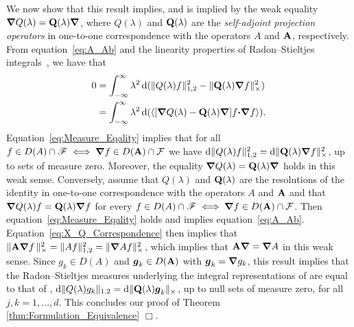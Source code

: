 \documentclass[amsa]{ipart}
\begin{document}
We now show that this result implies, and is implied by the weak
equality $\mbox{\boldmath${\nabla}$} Q(\lambda)=\mathbf{Q}(\lambda)\mbox{\boldmath${\nabla}$} $, where
$Q(\lambda)$ and $\mathbf{Q}(\lambda)$ are the \emph{self-adjoint projection operators}
in one-to-one correspondence with the operators $A$ and $\mathbf{A}$,
respectively. From equation~\eqref{eq:A_Ab} and the linearity
properties of Radon--Stieltjes integrals~\cite{Stone:64}, we have that    
%
\begin{align}\label{eq:Measure_Eqality}
  0&=\int_{-\infty}^\infty\lambda^2\,\d(\|Q(\lambda)f\|_{1,2}^2-\|\Qb(\lambda)\bnabla f\|_\times^2)
  \\
   &=\int_{-\infty}^\infty\lambda^2\,\d(\langle[\bnabla Q(\lambda)-\Qb(\lambda)\bnabla ]f\bcdot\bnabla f\rangle).
   \notag
\end{align}
%
Equation~\eqref{eq:Measure_Eqality} implies that for all
$f\in D(A)\cap\mathscr{F}\iff\mbox{\boldmath${\nabla}$} f\in D(\mathbf{A})\cap\mathcal{F}$ we have
$\mathrm{d}\|Q(\lambda)f\|_{1,2}^2=\mathrm{d}\|\mathbf{Q}(\lambda)\mbox{\boldmath${\nabla}$} f\|_\times^2$, up to sets of measure
zero. Moreover, the equality $\mbox{\boldmath${\nabla}$} Q(\lambda)=\mathbf{Q}(\lambda)\mbox{\boldmath${\nabla}$} $ holds
in this weak sense. Conversely, assume that $Q(\lambda)$ and 
$\mathbf{Q}(\lambda)$ are the resolutions of the identity in one-to-one
correspondence with the operators $A$ and $\mathbf{A}$ and that $\mbox{\boldmath${\nabla}$}
Q(\lambda)f=\mathbf{Q}(\lambda)\mbox{\boldmath${\nabla}$} f$ for every $f\in D(A)\cap\mathscr{F}\iff\mbox{\boldmath${\nabla}$} f\in D(\mathbf{A})\cap\mathcal{F}$. Then
equation~\eqref{eq:Measure_Eqality} holds and implies
equation~\eqref{eq:A_Ab}. Equation~\eqref{eq:X_Q_Correspondence} then
implies that $\|\mathbf{A}\mbox{\boldmath${\nabla}$} f\,\|_\times^2=\|Af\|_{1,2}^2=\|\mbox{\boldmath${\nabla}$} Af\|_\times^2$, which
implies that $\mathbf{A}\mbox{\boldmath${\nabla}$} =\mbox{\boldmath${\nabla}$} A$ in this weak sense. Since 
$g_k\in D(A)$ and $\boldsymbol{g}_k\in D(\mathbf{A})$ with $\boldsymbol{g}_k=\mbox{\boldmath${\nabla}$} g_k$, this result implies
that the Radon--Stieltjes measures underlying the integral
representations of  are equal to that of
, $\mathrm{d}\| Q(\lambda)g_k\|_{1,2}=\mathrm{d}\|\mathbf{Q}(\lambda)\boldsymbol{g}_k\|_\times$, up to
null sets of measure zero, for all $j,k=1,\ldots,d$. This concludes our
proof of Theorem \ref{thm:Formulation_Equivalence} $\Box$.     
\end{document}
